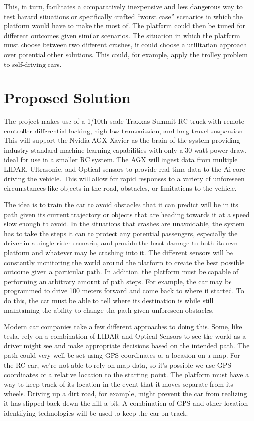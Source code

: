 \documentclass[journal,draftclsnofoot,onecolumn]{IEEEtran}
\begin{document}
This, in turn, facilitates a comparatively inexpensive and less dangerous way to test hazard situations or specifically crafted “worst case” scenarios in which the platform would have to make the most of. The platform could then be tuned for different outcomes given similar scenarios. The situation in which the platform must choose between two different crashes, it could choose a utilitarian approach over potential other solutions. This could, for example, apply the trolley problem to self-driving cars.

\section{Proposed Solution}

The project makes use of a 1/10th scale Traxxas Summit RC truck with remote controller differential locking, high-low transmission, and long-travel suspension. This will support the Nvidia AGX Xavier as the brain of the system providing industry-standard machine learning capabilities with only a 30-watt power draw, ideal for use in a smaller RC system. The AGX will ingest data from multiple LIDAR, Ultrasonic, and Optical sensors to provide real-time data to the Ai core driving the vehicle. This will allow for rapid responses to a variety of unforeseen circumstances like objects in the road, obstacles, or limitations to the vehicle. 

The idea is to train the car to avoid obstacles that it can predict will be in its path given its current trajectory or objects that are heading towards it at a speed slow enough to avoid. In the situations that crashes are unavoidable, the system has to take the steps it can to protect any potential passengers, especially the driver in a single-rider scenario, and provide the least damage to both its own platform and whatever may be crashing into it. The different sensors will be constantly monitoring the world around the platform to create the best possible outcome given a particular path. In addition, the platform must be capable of performing an arbitrary amount of path steps. For example, the car may be programmed to drive 100 meters forward and come back to where it started. To do this, the car must be able to tell where its destination is while still maintaining the ability to change the path given unforeseen obstacles.

Modern car companies take a few different approaches to doing this. Some, like tesla, rely on a combination of LIDAR and Optical Sensors to see the world as a driver might see and make appropriate decisions based on the intended path. The path could very well be set using GPS coordinates or a location on a map. For the RC car, we're not able to rely on map data, so it’s possible we use GPS coordinates or a relative location to the starting point. The platform must have a way to keep track of its location in the event that it moves separate from its wheels. Driving up a dirt road, for example, might prevent the car from realizing it has slipped back down the hill a bit. A combination of GPS and other location-identifying technologies will be used to keep the car on track. 
\end{document}
